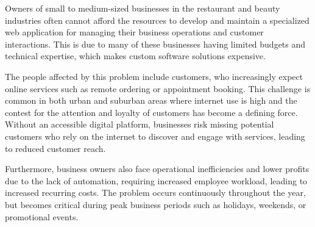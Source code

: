 \documentclass[]{VUMIFTemplateClass}
\begin{document}







Owners of small to medium-sized businesses in the restaurant and beauty
industries often cannot afford the resources to develop and maintain a
specialized web application for managing their business operations and customer
interactions. This is due to many of these businesses having limited budgets and
technical expertise, which makes custom software solutions expensive.

The people affected by this problem include customers, who increasingly expect
online services such as remote ordering or appointment booking. This challenge
is common in both urban and suburban areas where internet use is high and the
contest for the attention and loyalty of customers has become a defining force.
Without an accessible digital platform, businesses risk missing potential
customers who rely on the internet to discover and engage with services,
leading to reduced customer reach. 

Furthermore, business owners also face operational inefficiencies and lower
profits due to the lack of automation, requiring increased employee workload,
leading to increased recurring costs. The problem occurs continuously throughout
the year, but becomes critical during peak business periods such as holidays,
weekends, or promotional events.
\end{document}
